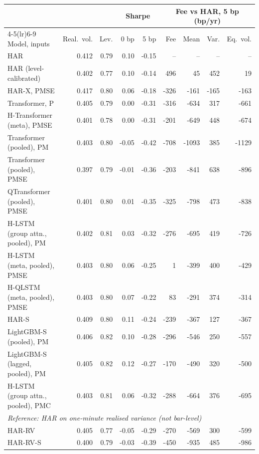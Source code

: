 \begin{tabular}{lrrrrrrrr}
\toprule
 & & & \multicolumn{2}{c}{Sharpe} & \multicolumn{4}{c}{Fee vs HAR, 5 bp (bp/yr)} \\
\cmidrule(lr){4-5}\cmidrule(lr){6-9}
Model, inputs & Real.\ vol. & Lev. & 0 bp & 5 bp & Fee & Mean & Var. & Eq.\ vol. \\
\midrule
HAR & 0.412 & 0.79 & 0.10 & -0.15 & -- & -- & -- & -- \\
HAR (level-calibrated) & 0.402 & 0.77 & 0.10 & -0.14 & 496 & 45 & 452 & 19 \\
HAR-X, PMSE & 0.417 & 0.80 & 0.06 & -0.18 & -326 & -161 & -165 & -163 \\
Transformer, P & 0.405 & 0.79 & 0.00 & -0.31 & -316 & -634 & 317 & -661 \\
H-Transformer (meta), PMSE & 0.401 & 0.78 & 0.00 & -0.31 & -201 & -649 & 448 & -674 \\
Transformer (pooled), PM & 0.403 & 0.80 & -0.05 & -0.42 & -708 & -1093 & 385 & -1129 \\
Transformer (pooled), PMSE & 0.397 & 0.79 & -0.01 & -0.36 & -203 & -841 & 638 & -896 \\
QTransformer (pooled), PMSE & 0.401 & 0.80 & 0.01 & -0.35 & -325 & -798 & 473 & -838 \\
H-LSTM (group attn., pooled), PM & 0.402 & 0.81 & 0.03 & -0.32 & -276 & -695 & 419 & -726 \\
H-LSTM (meta, pooled), PMSE & 0.403 & 0.80 & 0.06 & -0.25 & 1 & -399 & 400 & -429 \\
H-QLSTM (meta, pooled), PMSE & 0.403 & 0.80 & 0.07 & -0.22 & 83 & -291 & 374 & -314 \\
HAR-S & 0.409 & 0.80 & 0.11 & -0.24 & -239 & -367 & 127 & -367 \\
LightGBM-S (pooled), PM & 0.406 & 0.82 & 0.10 & -0.28 & -296 & -546 & 250 & -557 \\
LightGBM-S (lagged, pooled), PM & 0.405 & 0.82 & 0.12 & -0.27 & -170 & -490 & 320 & -500 \\
H-LSTM (group attn., pooled), PMC & 0.403 & 0.81 & 0.06 & -0.32 & -288 & -664 & 376 & -695 \\
\midrule
\multicolumn{9}{l}{\emph{Reference: HAR on one-minute realised variance (not bar-level)}} \\
HAR-RV & 0.405 & 0.77 & -0.05 & -0.29 & -270 & -569 & 300 & -599 \\
HAR-RV-S & 0.400 & 0.79 & -0.03 & -0.39 & -450 & -935 & 485 & -986 \\

\end{tabular}
